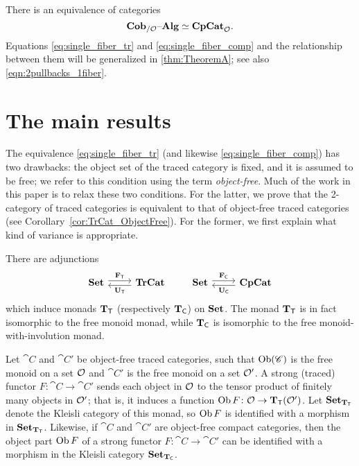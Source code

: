 \documentclass[11pt,oneside,article]{memoir}
\begin{document}
There is an equivalence of categories
\begin{equation}\label{eq:single_fiber_comp}
   \mathbf{Cob}_{/\mathcal{O}}{\text \textendash}\mathbf{Alg}\simeq\mathbf{CpCat}_{\mathcal{O}}.
\end{equation}
Equations \eqref{eq:single_fiber_tr} and \eqref{eq:single_fiber_comp} and the relationship between them will be generalized in \ref{thm:TheoremA}; see also \eqref{eqn:2pullbacks_1fiber}.

\section{The main results}\label{subsec:main_results}

The equivalence \eqref{eq:single_fiber_tr} (and likewise \eqref{eq:single_fiber_comp}) has two
drawbacks: the object set of the traced category is fixed, and it is assumed to be free; we refer to this condition using the term \emph{object-free}. Much of the
work in this paper is to relax these two conditions. For the latter, we prove that the 2-category of
traced categories is equivalent to that of object-free traced categories (see
Corollary~\ref{cor:TrCat_ObjectFree}). For the former, we first explain what kind of variance is
appropriate.

There are adjunctions
\begin{equation*}
   \Adjoint{\Set}{\TrCat}{\FT}{\UT}
   \qquad
   \Adjoint{\Set}{\CompCat}{\FC}{\UC}
\end{equation*}
which induce monads $\mathbf{T}_{\mathsf{T}}$ (respectively $\mathbf{T}_{\mathsf{C}}$) on $\mathbf{Set}$. The monad $\mathbf{T}_{\mathsf{T}}$ is in fact isomorphic to
the free monoid monad, while $\mathbf{T}_{\mathsf{C}}$ is isomorphic to the free monoid-with-involution monad.

Let $\cat{C}$ and $\cat{C}'$ be object-free traced categories, such that $\operatorname{Ob}(\mathscr{C})$ is the free
monoid on a set $\mathcal{O}$ and $\cat{C}'$ is the free monoid on a set $\mathcal{O}'$. A strong (traced)
functor $F\colon \cat{C}\to \cat{C}'$ sends each object in $\mathcal{O}$ to the tensor product of
finitely many objects in $\mathcal{O}'$; that is, it induces a function $\operatorname{Ob}
F\colon\mathcal{O}\to\mathbf{T}_{\mathsf{T}}(\mathcal{O}')$. Let $\mathbf{Set}_{\mathbf{T}_{\mathsf{T}}}$ denote the Kleisli category of this monad, so $\operatorname{Ob}
F$ is identified with a morphism in $\mathbf{Set}_{\mathbf{T}_{\mathsf{T}}}$. Likewise, if $\cat{C}$ and $\cat{C}'$ are object-free compact categories, then the object part $\operatorname{Ob}
F$ of a strong functor $F\colon\cat{C}\to\cat{C}'$ can be identified with a morphism in the Kleisli
category $\mathbf{Set}_{\mathbf{T}_{\mathsf{C}}}$.
\end{document}
